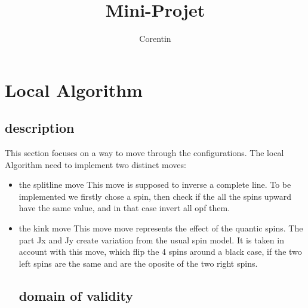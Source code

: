 \documentclass[a4paper,12pt,twoside]{article}
\title{Mini-Projet}
\author{Corentin \bsc{Bisot}}
\begin{document}
	\section{Local Algorithm}
	\subsection{description}
	This section focuses on a way to move through the configurations.
	The local Algorithm need to implement two distinct moves:
	\begin{itemize}
		\item{the splitline move} This move is supposed to inverse a complete line. To be implemented we firstly chose a spin, then check if the all the spins upward have the same value, and in that case invert all opf them.
		
		\item{the kink move} This move move represents the effect of the quantic spins. The part Jx and Jy create variation from the usual spin model. It is taken in account with this move, which flip the 4 spins around a black case, if the two left spins are the same and are the oposite of the two right spins.
	
	\subsection{domain of validity}

\end{itemize}
\end{document}
